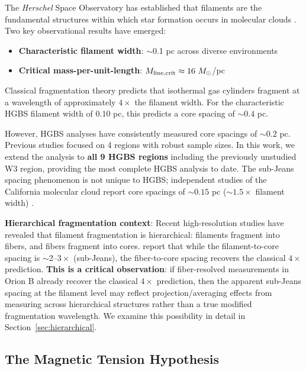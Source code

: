 \documentclass[11pt,a4paper]{article}
\begin{document}
The \textit{Herschel} Space Observatory has established that filaments are the fundamental structures within which star formation occurs in molecular clouds \citep{Andre2010}. Two key observational results have emerged:

\begin{itemize}
    \item \textbf{Characteristic filament width}: $\sim$0.1 pc across diverse environments \citep{Arzoumanian2011}
    \item \textbf{Critical mass-per-unit-length}: $M_{\rm line,crit} \approx 16~M_\odot$/pc \citep{Ostriker1964}
\end{itemize}

Classical fragmentation theory \citep{Inutsuka1992} predicts that isothermal gas cylinders fragment at a wavelength of approximately $4\times$ the filament width. For the characteristic HGBS filament width of $0.10$ pc, this predicts a core spacing of $\sim0.4$ pc.

However, HGBS analyses have consistently measured core spacings of $\sim0.2$ pc. Previous studies focused on 4 regions with robust sample sizes. In this work, we extend the analysis to \textbf{all 9 HGBS regions} including the previously unstudied W3 region, providing the most complete HGBS analysis to date. The sub-Jeans spacing phenomenon is not unique to HGBS; independent studies of the California molecular cloud report core spacings of $\sim0.15$ pc ($\sim1.5\times$ filament width) \citep{Zhang2024}.

\textbf{Hierarchical fragmentation context}: Recent high-resolution studies \citep{Yang2024} have revealed that filament fragmentation is hierarchical: filaments fragment into fibers, and fibers fragment into cores. \citet{Yang2024} report that while the filament-to-core spacing is $\sim$2--$3\times$ (sub-Jeans), the fiber-to-core spacing recovers the classical $4\times$ prediction. \textbf{This is a critical observation}: if fiber-resolved measurements in Orion B already recover the classical $4\times$ prediction, then the apparent sub-Jeans spacing at the filament level may reflect projection/averaging effects from measuring across hierarchical structures rather than a true modified fragmentation wavelength. We examine this possibility in detail in Section~\ref{sec:hierarchical}.

\subsection{The Magnetic Tension Hypothesis}
\end{document}

